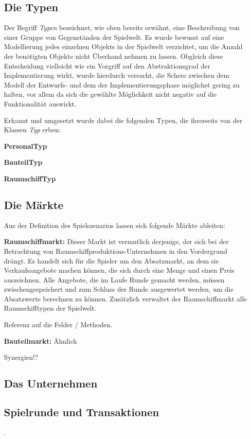 \subsection{Die Typen}
Der Begriff \textit{Typen} bezeichnet, wie oben bereits erwähnt, eine Beschreibung von einer Gruppe von Gegenständen der Spielwelt. Es wurde bewusst auf eine Modellierung jedes einzelnen Objekts in der Spielwelt verzichtet, um die Anzahl der benötigten Objekte nicht Überhand nehmen zu lassen. Obgleich diese Entscheidung vielleicht wie ein Vorgriff auf den Abstraktionsgrad der Implementierung wirkt, wurde hierdurch versucht, die Schere zwischen dem Modell der Entwurfs- und dem der Implementierungsphase möglichst gering zu halten, vor allem da sich die gewählte Möglichkeit nicht negativ auf die Funktionalität auswirkt.

Erkannt und umgesetzt wurde dabei die folgenden Typen, die ihrerseits von der Klassen \textit{Typ} erben:
\begin{seList}
\item \textbf{PersonalTyp}
\item \textbf{BauteilTyp}
\item \textbf{RaumschiffTyp}
\end{seList}

\subsection{Die Märkte}
Aus der Definition des Spielszenarios lassen sich folgende Märkte ableiten:
\begin{seList}
\item \textbf{Raumschiffmarkt:} Dieser Markt ist vermutlich derjenige, der sich bei der Betrachtung von Raumschiffproduktions-Unternehmen in den Vordergrund drängt. Es handelt sich für die Spieler um den Absatzmarkt, an dem sie Verkaufsangebote machen können, die sich durch eine Menge und einen Preis auszeichnen. Alle Angebote, die im Laufe Runde gemacht werden, müssen zwischengespeichert und zum Schluss der Runde ausgewertet werden, um die Absatzwerte berechnen zu können. Zusätzlich verwaltet der Raumschiffmarkt alle Raumschifftypen der Spielwelt.

Referenz auf die Felder / Methoden.
\item \textbf{Bauteilmarkt:} Ähnlich
\end{seList}

Synergien!?

\subsection{Das Unternehmen}

\subsection{Spielrunde und Transaktionen}

.